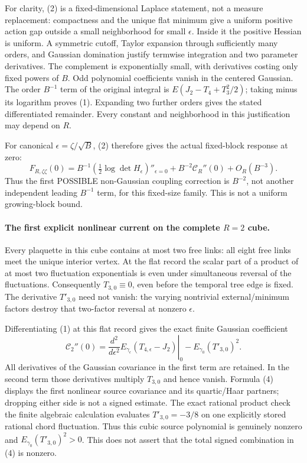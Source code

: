 \documentclass[11pt]{article}
\begin{document}
For clarity, (2) is a fixed-dimensional Laplace statement, not a
measure replacement: compactness and the unique flat minimum give a
uniform positive action gap outside a small neighborhood for small
$\epsilon$. Inside it the positive Hessian is uniform. A symmetric
cutoff, Taylor expansion through sufficiently many orders, and Gaussian
domination justify termwise integration and two parameter derivatives.
The complement is exponentially small, with derivatives costing only
fixed powers of $B$. Odd polynomial coefficients vanish in the centered
Gaussian. The order $B^{-1}$ term of the original integral is
$E(J_2-T_4+T_3^2/2)$; taking minus its logarithm proves (1).
Expanding two further orders gives the stated differentiated remainder.
Every constant and neighborhood in this justification may depend on $R$.

For canonical $\epsilon=\zeta/\sqrt B$, (2) therefore gives the actual
fixed-block response at zero:
\[
 \boxed{\quad
 F_{R,\zeta\zeta}(0)
 =B^{-1}\left(\tfrac12\log\det H_\epsilon\right)''_{\epsilon=0}
   +B^{-2}\mathcal C_R''(0)+O_R(B^{-3}).\quad}                     \tag{3}
\]
Thus the first POSSIBLE non-Gaussian coupling correction is $B^{-2}$,
not another independent leading $B^{-1}$ term, for this fixed-size
family. This is not a uniform growing-block bound.

\paragraph{The first explicit nonlinear current on the complete $R=2$ cube.}
Every plaquette in this cube contains at most two free links: all eight
free links meet the unique interior vertex. At the flat record the
scalar part of a product of at most two fluctuation exponentials is
even under simultaneous reversal of the fluctuations.
Consequently $T_{3,0}\equiv0$, even before the temporal tree edge is
fixed. The derivative $T'_{3,0}$ need not vanish: the varying
nontrivial external/minimum factors destroy that two-factor reversal
at nonzero $\epsilon$.

Differentiating (1) at this flat record gives the exact finite Gaussian
coefficient
\[
 \mathcal C_2''(0)
 =\left.\frac{d^2}{d\epsilon^2}
       E_{\gamma_\epsilon}(T_{4,\epsilon}-J_2)\right|_0
       -E_{\gamma_0}(T'_{3,0})^2 .                               \tag{4}
\]
All derivatives of the Gaussian covariance in the first term are
retained. In the second term those derivatives multiply $T_{3,0}$
and hence vanish. Formula (4) displays the first nonlinear source
covariance and its quartic/Haar partners; dropping either side is not
a signed estimate. The exact rational product check
the finite algebraic calculation evaluates
$T'_{3,0}=-3/8$ on one explicitly stored rational chord fluctuation.
Thus this cubic source polynomial is genuinely nonzero and
$E_{\gamma_0}(T'_{3,0})^2>0$. This does not assert that the total signed
combination in (4) is nonzero.
\end{document}
